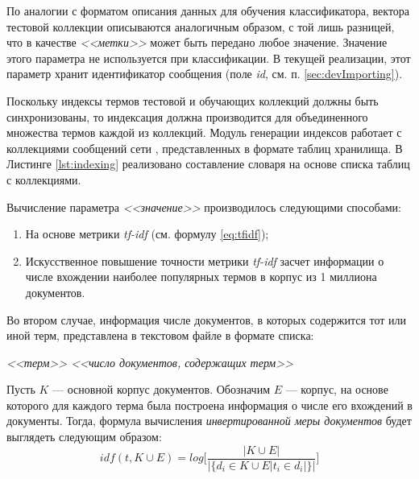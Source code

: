     По аналогии с форматом описания данных для обучения классификатора, вектора
    тестовой коллекции описываются аналогичным образом, с той лишь разницей, что
    в качестве {\it <<метки>>} может быть передано любое значение.
    Значение этого параметра не используется при классификации.
    В текущей реализации, этот параметр хранит идентификатор сообщения (поле
    {\it id}, см. п. \ref{sec:devImporting}).

    Поскольку индексы термов тестовой и обучающих коллекций должны быть
    синхронизованы, то индексация должна производится для объединенного
    множества термов каждой из коллекций.
    Модуль генерации индексов работает с коллекциями сообщений сети \twitter,
    представленных в формате таблиц хранилища. В Листинге \ref{lst:indexing}
    реализовано составление словаря на основе списка таблиц с коллекциями.

    \lstset{style=python}
    

    Вычисление параметра {\it <<значение>>} производилось следующими способами:
    \begin{enumerate}
        \item На основе метрики {\it tf-idf} (см. формулу \ref{eq:tfidf});
        \item Искусственное повышение точности метрики {\it tf-idf} засчет информации о числе
            вхождении наиболее популярных термов в корпус из 1 миллиона документов.
    \end{enumerate}

    Во втором случае, информация числе документов, в которых содержится тот или
    иной терм, представлена в текстовом файле в формате списка:
    \begin{center}
        \it
        <<терм>> <<число документов, содержащих терм>>
    \end{center}

    Пусть $K$ --- основной корпус документов.
    Обозначим $E$ --- корпус, на основе которого для каждого терма была построена
    информация о числе его вхождений в документы.
    Тогда, формула вычисления {\it инвертированной меры документов} будет выглядеть
    следующим образом:
    \begin{equation}
        idf(t, K \cup E) = log \Bigg[ \dfrac{|K \cup E|}{|\{d_i \in K \cup E | t_i \in d_i|\}|} \Bigg]
    \end{equation}

